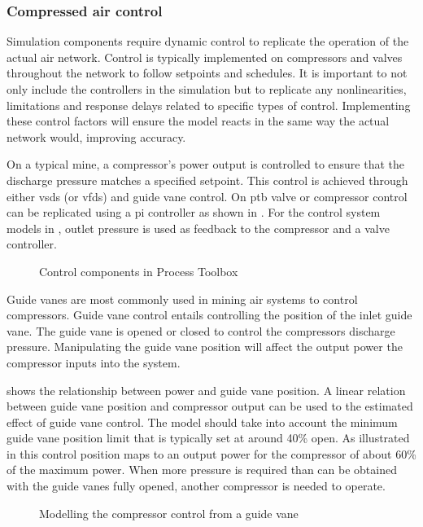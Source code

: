 		\subsubsection{Compressed air control}\label{Controllers}
			Simulation components require dynamic control to replicate the operation of the actual air network. Control is typically implemented on compressors and valves throughout the network to follow setpoints and schedules. It is important to not only include the controllers in the simulation but to replicate any nonlinearities, limitations and response delays related to specific types of control. Implementing these control factors will ensure the model reacts in the same way the actual network would, improving accuracy.
			\par 
			On a typical mine, a compressor's power output is controlled to ensure that the discharge pressure matches a specified setpoint. This control is achieved through either \glspl{vsd} (or \glspl{vfd}) and guide vane control. On \gls{ptb} valve or compressor control can be replicated using a \gls{pi} controller as shown in . For the control system models in , outlet pressure is used as feedback to the compressor and a valve controller. 
			\par 
			
	\begin{figure}[h!]
		\centering
		\caption[Control components in Process Toolbox]{Control components in Process Toolbox}
		\label{fig: Controller models}
	\end{figure}
		Guide vanes are most commonly used in mining air systems to control compressors. Guide vane control entails controlling the position of the inlet guide vane. The guide vane is opened or closed to control the compressors discharge pressure. Manipulating the guide vane position will affect the output power the compressor inputs into the system. 
		\par 
		 shows the relationship between power and guide vane position. A linear relation between guide vane position and compressor output can be used to the estimated effect of guide vane control. The model should take into account the minimum guide vane position limit that is typically set at around 40\% open. As illustrated in  this control position maps to an output power for the compressor of about 60\% of the maximum power. When more pressure is required than can be obtained with the guide vanes fully opened, another compressor is needed to operate. 
		\begin{figure}[h]
			\centering
			\fbox{}
			\caption{Modelling the compressor control from a guide vane\protect \footnotemark[1]}
			\label{fig: Guide vane position}
		\end{figure}
	

